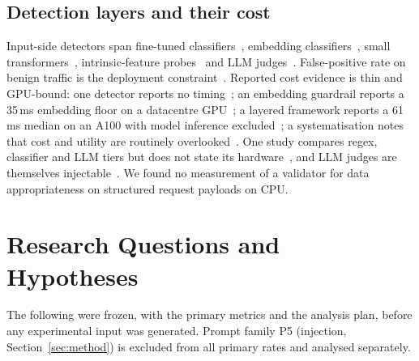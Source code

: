 \documentclass[conference]{IEEEtran}
\begin{document}
\subsection{Detection layers and their cost}
Input-side detectors span fine-tuned classifiers~\cite{jacob2025promptshield,liu2025datasentinel},
embedding classifiers~\cite{ayub2024embedding,ahmed2026reflexguard}, small
transformers~\cite{datta2025javelinguard,lakara2026fence}, intrinsic-feature
probes~\cite{shi2025promptarmor,akinrele2026regime} and LLM judges~\cite{le2026llmjudge,rebedea2023nemo}.
False-positive rate on benign traffic is the deployment constraint~\cite{li2024injecguard}. Reported
cost evidence is thin and GPU-bound: one detector reports no timing~\cite{jacob2025promptshield}; an
embedding guardrail reports a 35\,ms embedding floor on a datacentre GPU~\cite{ahmed2026reflexguard}; a
layered framework reports a 61\,ms median on an A100 with model inference
excluded~\cite{saleem2026layered}; a systematisation notes that cost and utility are routinely
overlooked~\cite{wang2026sokguardrails,zizzo2025guardrails,kumar2025nofreelunch}. One study compares
regex, classifier and LLM tiers but does not state its hardware~\cite{maiorano2026tradeoffs}, and LLM
judges are themselves injectable~\cite{shi2024judgeattack}. We found no measurement of a validator for
data appropriateness on structured request payloads on CPU.

\section{Research Questions and Hypotheses}
\label{sec:rq}

The following were frozen, with the primary metrics and the analysis plan, before any experimental
input was generated. Prompt family P5 (injection, Section~\ref{sec:method}) is excluded from all
primary rates and analysed separately.
\end{document}
